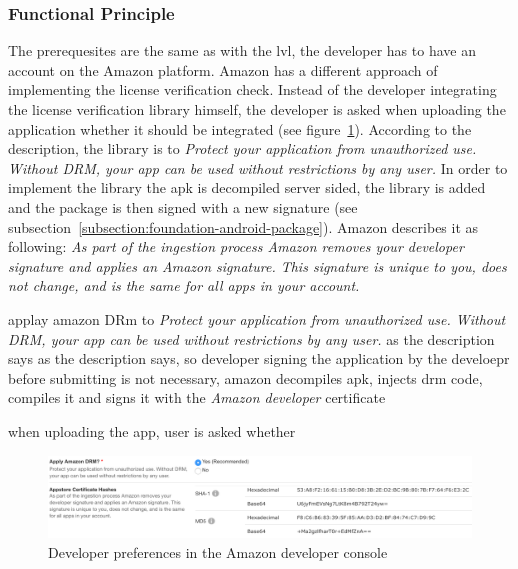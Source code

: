 \subsubsection{Functional Principle}\label{section:license-amazon-functional}
The prerequesites are the same as with the \gls{lvl}, the developer has to have an account on the Amazon platform.
Amazon has a different approach of implementing the license verification check.
Instead of the developer integrating the license verification library himself, the developer is asked when uploading the application whether it should be integrated (see figure~\ref{fig:amazon}).
According to the description, the library is to \textit{Protect your application from unauthorized use. Without DRM, your app can be used without restrictions by any user.} \cite{amazonDeveloper}
In order to implement the library the \gls{apk} is decompiled server sided, the library is added and the package is then signed with a new signature (see subsection~\ref{subsection:foundation-android-package}).
Amazon describes it as following: \textit{As part of the ingestion process Amazon removes your developer signature and applies an Amazon signature. This signature is unique to you, does not change, and is the same for all apps in your account.} \cite{amazonDeveloper}

 applay amazon DRm to \textit{Protect your application from unauthorized use. Without DRM, your app can be used without restrictions by any user.} as the description says
  as the description says, so developer signing the application by the develoepr before submitting is not necessary, amazon decompiles apk, injects drm code, compiles it and signs it with the \textit{Amazon developer} certificate

when uploading the app, user is asked whether
\begin{figure}[h]
    \centering
    \includegraphics[width=1\textwidth]{data/amazon.png}
    \caption{Developer preferences in the Amazon developer console \cite{amazonDeveloper}}
    \label{fig:amazon}
\end{figure}

